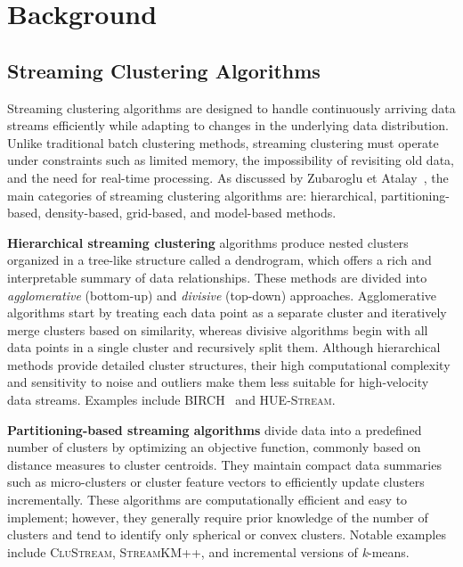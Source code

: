 \chapter{Background}\label{ch:background}

\section{Streaming Clustering Algorithms}\label{sec:streaming_clustering_algorithms}

Streaming clustering algorithms are designed to handle continuously arriving
data streams efficiently while adapting to changes in the underlying data
distribution. Unlike traditional batch clustering methods, streaming clustering
must operate under constraints such as limited memory, the impossibility of
revisiting old data, and the need for real-time processing. As discussed by
Zubaroglu et Atalay~\cite{streaming_clustering_review}, the main categories of
streaming clustering algorithms are: hierarchical,
partitioning-based, density-based, grid-based, and model-based methods.

\textbf{Hierarchical streaming clustering} algorithms produce nested clusters organized
in a tree-like structure called a dendrogram, which offers a rich and interpretable
summary of data relationships. These methods are divided into \textit{agglomerative} (bottom-up)
and \textit{divisive} (top-down) approaches. Agglomerative algorithms start by treating
each data point as a separate cluster and iteratively merge clusters based on similarity,
whereas divisive algorithms begin with all data points in a single cluster and recursively
split them. Although hierarchical methods provide detailed cluster structures, their high
computational complexity and sensitivity to noise and outliers make them less suitable for
high-velocity data streams. Examples include \textsc{BIRCH}~\cite{birch} and \textsc{HUE-Stream}.

\textbf{Partitioning-based streaming algorithms} divide data into a predefined number of clusters
by optimizing an objective function, commonly based on distance measures to cluster centroids. They
maintain compact data summaries such as micro-clusters or cluster feature vectors to efficiently update
clusters incrementally. These algorithms are computationally efficient and easy to implement; however,
they generally require prior knowledge of the number of clusters and tend to identify only spherical
or convex clusters. Notable examples include \textsc{CluStream}, \textsc{StreamKM++}, and incremental
versions of \textit{k}-means.

